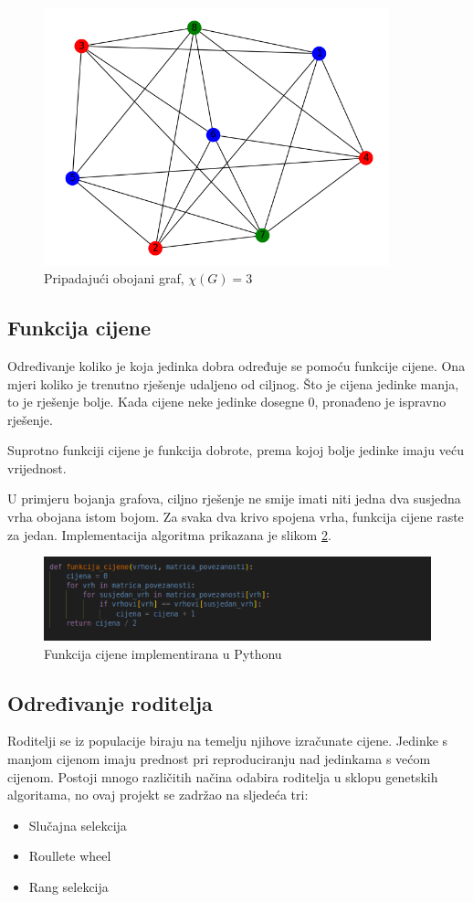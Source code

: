 \documentclass[times, utf8, zavrsni]{fer}
\begin{document}
\begin{figure}[htb]
\centering
\includegraphics[width=10cm]{images/genom_encoding_graph.png}
\caption{Pripadajući obojani graf, $\chi(G)=3$}
\label{fig:kodiranje genoma graf}
\end{figure}

\subsection{Funkcija cijene}
Određivanje koliko je koja jedinka dobra određuje se pomoću funkcije cijene. Ona mjeri koliko je trenutno rješenje udaljeno od ciljnog. Što je cijena jedinke manja, to je rješenje bolje. Kada cijene neke jedinke dosegne 0, pronađeno je ispravno rješenje.

Suprotno funkciji cijene je funkcija dobrote, prema kojoj bolje jedinke imaju veću vrijednost.

U primjeru bojanja grafova, ciljno rješenje ne smije imati niti jedna dva susjedna vrha obojana istom bojom. Za svaka dva krivo spojena vrha, funkcija cijene raste za jedan. Implementacija algoritma prikazana je slikom \ref{fig:funkcija cijene}.

\begin{figure}[htb]
\centering
\includegraphics[width=12cm]{images/funkcija_cijene.png}
\caption{Funkcija cijene implementirana u Pythonu}
\label{fig:funkcija cijene}
\end{figure}

\subsection{Određivanje roditelja}
Roditelji se iz populacije biraju na temelju njihove izračunate cijene. Jedinke s manjom cijenom imaju prednost pri reproduciranju nad jedinkama s većom cijenom. Postoji mnogo različitih načina odabira roditelja u sklopu genetskih algoritama, no ovaj projekt se zadržao na sljedeća tri:
\begin{itemize}
    \item Slučajna selekcija
    \item Roullete wheel
    \item Rang selekcija
\end{itemize}
\end{document}
